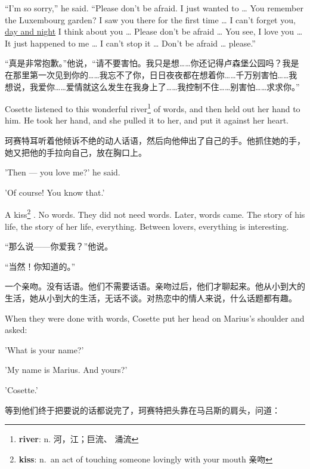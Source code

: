 \documentclass[fontset=ubuntu, zihao=5]{ctexart}
\begin{document}
\begin{paracol}{2}
\switchcolumn*

``I'm so sorry,'' he said. ``Please don't be afraid. I just wanted to \ldots{} You remember the Luxembourg garden? I saw you there for the first time \ldots{} I can't forget you, \uline{day and night} I think about you \ldots{} Please don't be afraid \ldots{} You see, I love you \ldots{} It just happened to me \ldots{} I can't stop it \ldots{} Don't be afraid \ldots{} please.''

\switchcolumn

“真是非常抱歉。”他说，“请不要害怕。我只是想……你还记得卢森堡公园吗？我是在那里第一次见到你的……我忘不了你，日日夜夜都在想着你……千万别害怕……我想说，我爱你……爱情就这么发生在我身上了……我控制不住……别害怕……求求你。”

\switchcolumn*

Cosette listened to this wonderful river\footnote{\textbf{river}: n. 河，江；巨流、
  涌流} of words, and then held out her hand to him. He took her hand, and she
pulled it to her, and put it against her heart.


\switchcolumn

珂赛特耳听着他倾诉不绝的动人话语，然后向他伸出了自己的手。他抓住她的手，她又把他的手拉向自己，放在胸口上。

\switchcolumn*

'Then --- you love me?' he said.

'Of course! You know that.'


A kiss\footnote{\textbf{kiss}: n. an act of touching someone lovingly with
  your mouth 亲吻} . No words. They did not need words. Later, words came.
The story of his life, the story of her life, everything. Between lovers,
everything is interesting.

\switchcolumn

“那么说——你爱我？”他说。

“当然！你知道的。”

一个亲吻。没有话语。他们不需要话语。亲吻过后，他们才聊起来。他从小到大的生活，她从小到大的生活，无话不谈。对热恋中的情人来说，什么话题都有趣。

\switchcolumn*

When they were done with words, Cosette put her head on Marius's shoulder and asked:


'What is your name?'


'My name is Marius. And yours?'


'Cosette.'

\switchcolumn

等到他们终于把要说的话都说完了，珂赛特把头靠在马吕斯的肩头，问道：


\end{paracol}
\end{document}
